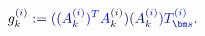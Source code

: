 \documentclass[12pt]{article}
\begin{document}
\makeatletter
\renewcommand*{\@textcolor}[3]{%
  \protect\leavevmode
  \begingroup
    \color#1{#2}#3%
  \endgroup
}
\makeatother
\begin{displaymath}
\mathcolor[RGB]{0,0,15}{g} _ { \mathcolor[RGB]{0,0,30}{k} } ^ { \mathcolor[RGB]{0,0,45}{(} \mathcolor[RGB]{0,0,60}{i} \mathcolor[RGB]{0,0,75}{)} } \mathcolor[RGB]{0,0,90}{:} \mathcolor[RGB]{0,0,105}{=} \mathcolor[RGB]{0,0,120}{(} \mathcolor[RGB]{0,0,135}{(} \mathcolor[RGB]{0,0,150}{A} _ { \mathcolor[RGB]{0,0,165}{k} } ^ { \mathcolor[RGB]{0,0,180}{(} \mathcolor[RGB]{0,0,195}{i} \mathcolor[RGB]{0,0,210}{)} } \mathcolor[RGB]{0,0,225}{)} ^ { \mathcolor[RGB]{0,0,240}{T} } \mathcolor[RGB]{0,0,255}{A} _ { \mathcolor[RGB]{0,15,0}{k} } ^ { \mathcolor[RGB]{0,15,15}{(} \mathcolor[RGB]{0,15,30}{i} \mathcolor[RGB]{0,15,45}{)} } \mathcolor[RGB]{0,15,60}{)} \mathcolor[RGB]{0,15,75}{(} \mathcolor[RGB]{0,15,90}{A} _ { \mathcolor[RGB]{0,15,105}{k} } ^ { \mathcolor[RGB]{0,15,120}{(} \mathcolor[RGB]{0,15,135}{i} \mathcolor[RGB]{0,15,150}{)} } \mathcolor[RGB]{0,15,165}{)} \mathcolor[RGB]{0,15,180}{T} _ { \mathcolor[RGB]{0,15,195}{\bm} { \mathcolor[RGB]{0,15,210}{s} } } ^ { \mathcolor[RGB]{0,15,225}{(} \mathcolor[RGB]{0,15,240}{i} \mathcolor[RGB]{0,15,255}{)} } \mathcolor[RGB]{0,30,0}{.}
\end{displaymath}
\end{document}
